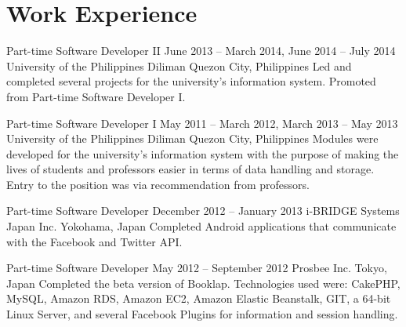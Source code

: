 \section*{Work Experience}

\employment
	{Part-time Software Developer II}
	{June 2013 -- March 2014, June 2014 -- July 2014}
	{University of the Philippines Diliman}
	{Quezon City, Philippines}
	{Led and completed several projects for the university's information system. Promoted from Part-time Software Developer I.}

\employment
	{Part-time Software Developer I}
	{May 2011 -- March 2012, March 2013 -- May 2013}
	{University of the Philippines Diliman}
	{Quezon City, Philippines}
	{Modules were developed for the university's information system with the purpose of making the lives of students and professors easier in terms of data handling and storage. Entry to the position was via recommendation from professors.}

\employment
	{Part-time Software Developer}
	{December 2012 -- January 2013}
	{i-BRIDGE Systems Japan Inc.}
	{Yokohama, Japan}
	{Completed Android applications that communicate with the Facebook and Twitter API.}

\employment
	{Part-time Software Developer}
	{May 2012 -- September 2012}
	{Prosbee Inc.}
	{Tokyo, Japan}
	{Completed the beta version of Booklap. Technologies used were: CakePHP, MySQL, Amazon RDS, Amazon EC2, Amazon Elastic Beanstalk, GIT, a 64-bit Linux Server, and several Facebook Plugins for information and session handling.}


